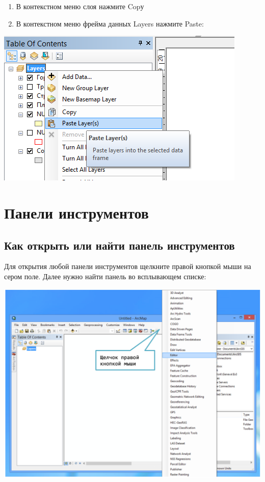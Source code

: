 \documentclass[12pt,]{book}
\begin{document}
\begin{enumerate}
\def\labelenumi{\arabic{enumi}.}
\item
  В контекстном меню слоя нажмите Copу
\item
  В контекстном меню фрейма данных Layers нажмите Paste:
\end{enumerate}

\includegraphics{images/Appendix/image14.png}

\hypertarget{manual-toolbar}{%
\chapter{Панели инструментов}\label{manual-toolbar}}

\hypertarget{section-19}{%
\section{Как открыть или найти панель инструментов}\label{section-19}}

Для открытия любой панели инструментов щелкните правой кнопкой мыши на сером поле. Далее нужно найти панель во всплывающем списке:

\includegraphics{images/Appendix/image3.png}
\end{document}
